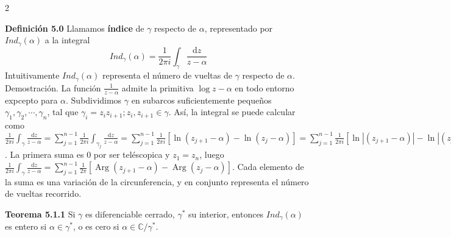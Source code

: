 \documentclass[a4paper, 11pt]{extarticle}
\newcommand{\tma}[1]{\textcolor{rojo}{\textbf{Teorema #1}}}
\newcommand{\defi}[1]{\textcolor{azul}{\textbf{Definición #1}}}
\newcommand{\dem}[1]{\textcolor{gris}{\small{Demostración. #1}}}
\begin{document}
\begin{multicols*}{2}


\defi{5.0} Llamamos \textbf{índice} de \(\gamma\) respecto de \(\alpha\),
representado por \(Ind_{\gamma}(\alpha)\) a la integral 
\[ Ind_{\gamma}(\alpha) = \frac{1}{2\pi i}\int _\gamma \frac{\text{d}
z}{z-\alpha}   \]
Intuitivamente \(Ind_\gamma(\alpha)\) representa el número de vueltas de \(\gamma\) respecto de \(\alpha\).
\dem{ La función \( \frac{1}{z-\alpha} \) admite la primitiva \( \log{z - \alpha} \) en todo entorno expcepto 
para \( \alpha \). Subdividimos \( \gamma \) en subarcos suficientemente pequeños \( \gamma_1, \gamma_2, \cdots, \gamma_n \), tal que
\( \gamma_i = z_iz_{i+1}; z_i,z_{i+1} \in \gamma \). Así, la integral se puede calcular como 
\( \frac{1}{2\pi i} \int _\gamma  \frac{\text{d} z}{z - \alpha} =
 \sum _{j=1}^{n-1} \frac{1}{2\pi i} \int _{\gamma_j}  \frac{\text{d} z}{z - \alpha} 
= \sum_{j=1}^{n-1} \frac{1}{2 \pi i}[\ln (z_{j+1}-\alpha)-\ln (z_{j}-\alpha)] = 
 \sum_{j=1}^{n-1} \frac{1}{2 \pi i}[\ln |(z_{j+1}-\alpha)|-\ln |(z_{j}-\alpha)|]+\sum_{j=1}^{n-1} 
\frac{1}{2 \pi}[\operatorname{Arg}(z_{j+1}-\alpha)-\operatorname{Arg}(z_{j}-\alpha)]
 \). La primera suma es 0 por ser teléscopica y \( z_1 = z_n \), luego 
\( \frac{1}{2\pi i} \int _\gamma  \frac{\text{d} z}{z - \alpha} = \sum_{j=1}^{n-1} 
\frac{1}{2 \pi}[\operatorname{Arg}(z_{j+1}-\alpha)-\operatorname{Arg}(z_{j}-\alpha)] \). Cada elemento de la suma
es una variación de la circunferencia, y en conjunto representa el número de vueltas
recorrido.}

\tma{5.1.1} Si \(\gamma\) es diferenciable cerrado, \(\gamma^*\) su
interior, entonces \(Ind_\gamma(\alpha)\) es
entero si \(\alpha \in \gamma^*\), o es cero si \(\alpha \in
\mathbb{C}/\gamma^*\). 


\end{multicols*}
\end{document}
